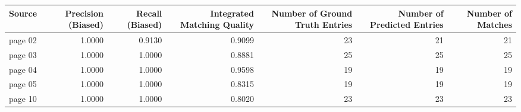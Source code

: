 \begin{tabular}{lrrrrrr}
\toprule
Source & Precision (Biased) & Recall (Biased) & Integrated Matching Quality & Number of Ground Truth Entries & Number of Predicted Entries & Number of Matches \\
\midrule
page 02 & 1.0000 & 0.9130 & 0.9099 & 23 & 21 & 21 \\
page 03 & 1.0000 & 1.0000 & 0.8881 & 25 & 25 & 25 \\
page 04 & 1.0000 & 1.0000 & 0.9598 & 19 & 19 & 19 \\
page 05 & 1.0000 & 1.0000 & 0.8315 & 19 & 19 & 19 \\
page 10 & 1.0000 & 1.0000 & 0.8020 & 23 & 23 & 23 \\
\bottomrule
\end{tabular}
